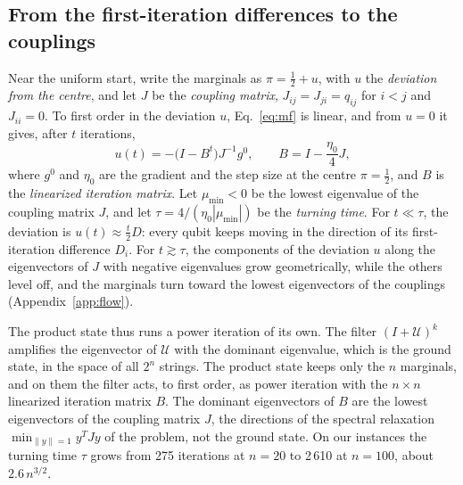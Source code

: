 \documentclass[onecolumn,10pt]{article}
\theoremstyle{remark}
\theoremstyle{plain}
\begin{document}
\subsection{From the first-iteration differences to the couplings}
\label{sec:couplings}
Near the uniform start, write the marginals as $\pi=\frac12+u$, with $u$ the \emph{deviation from the centre}, and let $J$ be the \emph{coupling matrix}, $J_{ij}=J_{ji}=q_{ij}$ for $i<j$ and $J_{ii}=0$. To first order in the deviation $u$, Eq.~\eqref{eq:mf} is linear, and from $u=0$ it gives, after $t$ iterations,
\begin{equation}
\label{eq:linear}
u(t)=-\bigl(I-B^t\bigr)J^{-1}g^0,\qquad B=I-\frac{\eta_0}{4}J,
\end{equation}
where $g^0$ and $\eta_0$ are the gradient and the step size at the centre $\pi=\frac12$, and $B$ is the \emph{linearized iteration matrix}. Let $\mu_{\min}<0$ be the lowest eigenvalue of the coupling matrix $J$, and let $\tau=4/(\eta_0|\mu_{\min}|)$ be the \emph{turning time}. For $t\ll\tau$, the deviation is $u(t)\approx\frac t2D$: every qubit keeps moving in the direction of its first-iteration difference $D_i$. For $t\gtrsim\tau$, the components of the deviation $u$ along the eigenvectors of $J$ with negative eigenvalues grow geometrically, while the others level off, and the marginals turn toward the lowest eigenvectors of the couplings (Appendix~\ref{app:flow}).

The product state thus runs a power iteration of its own. The filter $(I+\mathcal{U})^k$ amplifies the eigenvector of $\mathcal{U}$ with the dominant eigenvalue, which is the ground state, in the space of all $2^n$ strings. The product state keeps only the $n$ marginals, and on them the filter acts, to first order, as power iteration with the $n\times n$ linearized iteration matrix $B$. The dominant eigenvectors of $B$ are the lowest eigenvectors of the coupling matrix $J$, the directions of the spectral relaxation $\min_{\|y\|=1}y^TJy$ of the problem, not the ground state. On our instances the turning time $\tau$ grows from 275 iterations at $n=20$ to 2\,610 at $n=100$, about $2.6\,n^{3/2}$.
\end{document}
